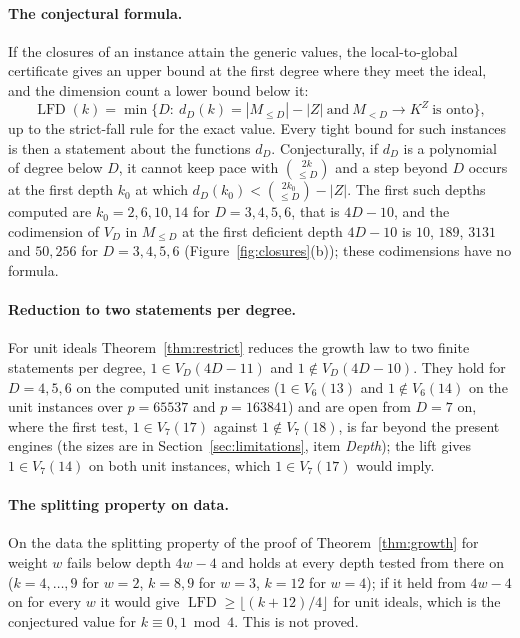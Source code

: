 \documentclass[11pt]{article}
\theoremstyle{definition}\newtheorem{definition}[theorem]{Definition}
\theoremstyle{remark}\newtheorem{remark}[theorem]{Remark}
\newcommand{\lfd}{\operatorname{LFD}}
\begin{document}
\paragraph{The conjectural formula.}
If the closures of an instance attain the generic values, the local-to-global
certificate gives an upper bound at the first degree where they meet the
ideal, and the dimension count a lower bound below it:
\[
 \lfd(k)=\min\{D:\ d_D(k)=|M_{\le D}|-|Z|\ \text{and}\ M_{<D}\to K^Z\ \text{is onto}\},
\]
up to the strict-fall rule for the exact value. Every tight bound for such
instances is then a statement about the functions $d_D$. Conjecturally, if
$d_D$ is a polynomial of degree below $D$, it cannot keep pace with
$\binom{2k}{\le D}$ and a step beyond $D$ occurs at the first depth $k_0$ at
which $d_D(k_0)<\binom{2k_0}{\le D}-|Z|$. The first such depths computed are
$k_0=2,6,10,14$ for $D=3,4,5,6$, that is $4D-10$, and the codimension of
$V_D$ in $M_{\le D}$ at the first deficient depth $4D-10$ is $10$, $189$,
$3131$ and $50{,}256$ for $D=3,4,5,6$ (Figure~\ref{fig:closures}(b)); these
codimensions have no formula.

\paragraph{Reduction to two statements per degree.} For unit ideals
Theorem~\ref{thm:restrict} reduces the growth law to two finite statements
per degree, $1\in V_D(4D-11)$ and $1\notin V_D(4D-10)$. They hold for
$D=4,5,6$ on the computed unit instances ($1\in V_6(13)$ and
$1\notin V_6(14)$ on the unit instances over $p=65537$ and $p=163841$) and
are open from $D=7$ on, where the first test, $1\in V_7(17)$ against
$1\notin V_7(18)$, is far beyond the present engines (the sizes are in
Section~\ref{sec:limitations}, item \emph{Depth}); the lift gives
$1\in V_7(14)$ on both unit instances, which $1\in V_7(17)$ would imply.

\paragraph{The splitting property on data.} On the data the splitting
property of the proof of Theorem~\ref{thm:growth} for weight $w$ fails
below depth $4w-4$ and holds at every depth tested from there on
($k=4,\ldots,9$ for $w=2$, $k=8,9$ for $w=3$, $k=12$ for $w=4$); if it held
from $4w-4$ on for every $w$ it would give $\lfd\ge\lfloor(k+12)/4\rfloor$
for unit ideals, which is the conjectured value for $k\equiv0,1\bmod4$.
This is not proved.
\end{document}
